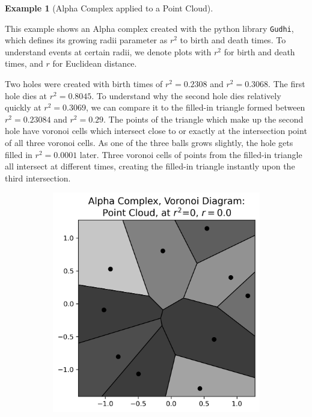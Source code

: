 \documentclass[ma]{uncgdissertationexp}
\theoremstyle{plain}
\theoremstyle{definition}
\newtheorem{example}[theorem]{Example}
\theoremstyle{remark}
\begin{document}
\newpage
\begin{example}[Alpha Complex applied to a Point Cloud]\label{ex:point_cloud_alpha}
\par This example shows an Alpha complex created with the python library \verb"Gudhi", which defines its growing radii parameter as $r^{2}$ to birth and death times. To understand events at certain radii, we denote plots with $r^{2}$ for birth and death times, and $r$ for Euclidean distance.
\par Two holes were created with birth times of $r^{2}=0.2308$ and $r^{2}=0.3068$. The first hole dies at $r^{2}=0.8045$. To understand why the second hole dies relatively quickly at $r^{2}=0.3069$, we can compare it to the filled-in triangle formed between $r^{2} = 0.23084$ and $r^{2} = 0.29$. The points of the triangle which make up the second hole have voronoi cells which intersect close to or exactly at the intersection point of all three voronoi cells. As one of the three balls grows slightly, the hole gets filled in $r^{2}=0.0001$ later. Three voronoi cells of points from the filled-in triangle all intersect at different times, creating the filled-in triangle instantly upon the third intersection.
\begin{figure}[H]
    \centering
    \begin{subfigure}[b]{0.26\textwidth}
        \includegraphics[width=\textwidth]{point_cloud_plot_alpha_0.png}

\end{subfigure}
\end{figure}
\end{example}
\end{document}

